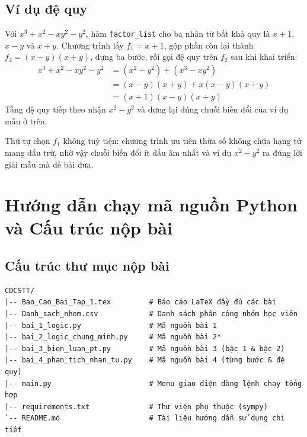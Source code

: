 \documentclass[12pt,a4paper]{article}
\begin{document}
\subsection{Ví dụ đệ quy}
Với $x^3 + x^2 - xy^2 - y^2$, hàm \texttt{factor\_list} cho ba nhân tử bất khả quy là $x+1$, $x-y$ và $x+y$. Chương trình lấy $f_1 = x+1$, gộp phần còn lại thành $f_2 = (x-y)(x+y)$, dựng ba bước, rồi gọi đệ quy trên $f_2$ sau khi khai triển:
\begin{align*}
    x^3 + x^2 - xy^2 - y^2 &= (x^2 - y^2) + (x^3 - xy^2) \\
                           &= (x-y)(x+y) + x(x-y)(x+y) \\
                           &= (x + 1)(x-y)(x+y)
\end{align*}
Tầng đệ quy tiếp theo nhận $x^2 - y^2$ và dựng lại đúng chuỗi biến đổi của ví dụ mẫu ở trên.

Thứ tự chọn $f_1$ không tuỳ tiện: chương trình ưu tiên thừa số không chứa hạng tử mang dấu trừ, nhờ vậy chuỗi biến đổi ít dấu âm nhất và ví dụ $x^2 - y^2$ ra đúng lời giải mẫu mà đề bài đưa.

\newpage
\section{Hướng dẫn chạy mã nguồn Python và Cấu trúc nộp bài}

\subsection{Cấu trúc thư mục nộp bài}
\begin{verbatim}
CDCSTT/
|-- Bao_Cao_Bai_Tap_1.tex         # Báo cáo LaTeX đầy đủ các bài
|-- Danh_sach_nhom.csv            # Danh sách phân công nhóm học viên
|-- bai_1_logic.py                # Mã nguồn bài 1
|-- bai_2_logic_chung_minh.py     # Mã nguồn bài 2*
|-- bai_3_bien_luan_pt.py         # Mã nguồn bài 3 (bậc 1 & bậc 2)
|-- bai_4_phan_tich_nhan_tu.py    # Mã nguồn bài 4 (từng bước & đệ quy)
|-- main.py                       # Menu giao diện dòng lệnh chạy tổng hợp
|-- requirements.txt              # Thư viện phụ thuộc (sympy)
`-- README.md                     # Tài liệu hướng dẫn sử dụng chi tiết
\end{verbatim}
\end{document}
